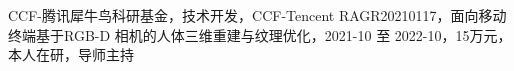 
\program


\noindent[1] CCF-腾讯犀牛鸟科研基金，技术开发，CCF-Tencent RAGR20210117，面向移动终端基于RGB-D 相机的人体三维重建与纹理优化，2021-10 至 2022-10，15万元，本人在研，导师主持